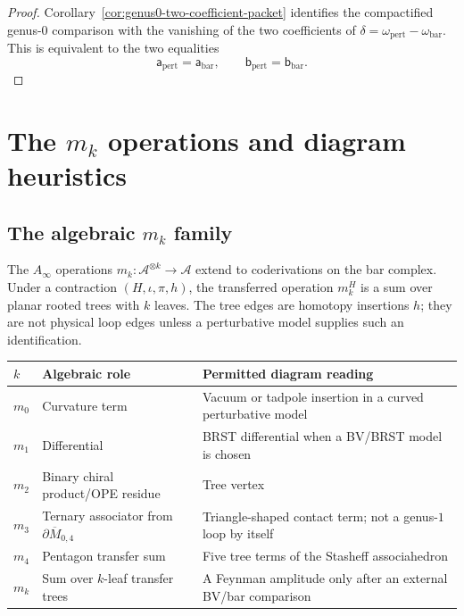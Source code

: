 \begin{proof}
Corollary~\ref{cor:genus0-two-coefficient-packet} identifies the
compactified genus-$0$ comparison with the vanishing of the two
coefficients of
\(\delta=\omega_{\mathrm{pert}}-\omega_{\mathrm{bar}}\).
This is equivalent to the two equalities
\[
\mathsf{a}_{\mathrm{pert}}=\mathsf{a}_{\mathrm{bar}},
\qquad
\mathsf{b}_{\mathrm{pert}}=\mathsf{b}_{\mathrm{bar}}.
\]
\end{proof}

\section{\texorpdfstring{The $m_k$ operations and diagram heuristics}{The m k operations and diagram heuristics}}
\label{sec:mk-feynman-complete}

\subsection{\texorpdfstring{The algebraic $m_k$ family}{The algebraic m k family}}

\begin{definition}
\label{def:mk-family-feynman}
The $A_\infty$ operations
$m_k\colon \mathcal A^{\otimes k}\to\mathcal A$ extend to
coderivations on the bar complex.  Under a contraction
$(H,\iota,\pi,h)$, the transferred operation $m_k^H$ is a sum over
planar rooted trees with $k$ leaves.  The tree edges are homotopy
insertions $h$; they are not physical loop edges unless a perturbative
model supplies such an identification.

\begin{center}
\begin{tabular}{|>{\raggedright\arraybackslash}p{1.2cm}|>{\raggedright\arraybackslash}p{4.4cm}|>{\raggedright\arraybackslash}p{5.7cm}|}
\hline
\textbf{$k$} & \textbf{Algebraic role} & \textbf{Permitted diagram reading} \\
\hline
$m_0$ & Curvature term & Vacuum or tadpole insertion in a curved perturbative model \\
\hline
$m_1$ & Differential & BRST differential when a BV/BRST model is chosen \\
\hline
$m_2$ & Binary chiral product/OPE residue & Tree vertex \\
\hline
$m_3$ & Ternary associator from $\partial\overline{M}_{0,4}$ & Triangle-shaped contact term; not a genus-$1$ loop by itself \\
\hline
$m_4$ & Pentagon transfer sum & Five tree terms of the Stasheff associahedron \\
\hline
$m_k$ & Sum over $k$-leaf transfer trees & A Feynman amplitude only after an external BV/bar comparison \\
\hline
\end{tabular}
\end{center}
\end{definition}

